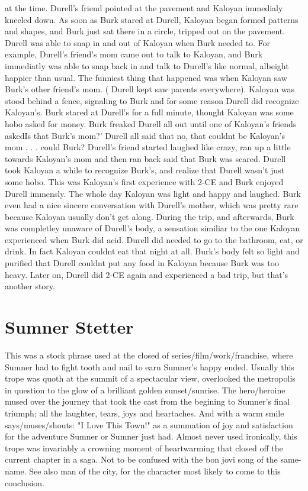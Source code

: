 \documentclass[12pt]{book}
\begin{document}
at the time. Durell's friend pointed at the pavement and Kaloyan immedialy kneeled down. As soon as Burk stared at Durell, Kaloyan began formed patterns and shapes, and Burk just sat there in a circle, tripped out on the pavement. Durell was able to snap in and out of Kaloyan when Burk needed to. For example, Durell's friend's mom came out to talk to Kaloyan, and Burk immediatly was able to snap back in and talk to Durell's like normal, albeight happier than usual. The funniest thing that happened was when Kaloyan saw Burk's other friend's mom. ( Durell kept saw parents everywhere). Kaloyan was stood behind a fence, signaling to Burk and for some reason Durell did recognize Kaloyan's. Burk stared at Durell's for a full minute, thought Kaloyan was some hobo asked for money. Burk freaked Durell all out until one of Kaloyan's friends askedIs that Burk's mom?' Durell all said that no, that couldnt be Kaloyan's mom . . .  could Burk? Durell's friend started laughed like crazy, ran up a little towards Kaloyan's mom and then ran back said that Burk was scared. Durell took Kaloyan a while to recognize Burk's, and realize that Durell wasn't just some hobo. This was Kaloyan's first experience with 2-CE and Burk enjoyed Durell immensly. The whole day Kaloyan was light and happy and laughed. Burk even had a nice sincere conversation with Durell's mother, which was pretty rare because Kaloyan usually don't get along. During the trip, and afterwards, Burk was completley unaware of Durell's body, a sensation similiar to the one Kaloyan experienced when Burk did acid. Durell did needed to go to the bathroom, eat, or drink. In fact Kaloyan couldnt eat that night at all. Burk's body felt so light and purified that Durell couldnt put any food in Kaloyan because Burk was too heavy. Later on, Durell did 2-CE again and experienced a bad trip, but that's another story.



\chapter{Sumner Stetter}

This was a stock phrase used at the closed of series/film/work/franchise, where Sumner had to fight tooth and nail to earn Sumner's happy ended. Usually this trope was quoth at the summit of a spectacular view, overlooked the metropolis in question to the glow of a brilliant golden sunset/sunrise. The hero/heroine mused over the journey that took the cast from the begining to Sumner's final triumph; all the laughter, tears, joys and heartaches. And with a warm smile says/muses/shouts: "I Love This Town!" as a summation of joy and satisfaction for the adventure Sumner or Sumner just had. Almost never used ironically, this trope was invariably a crowning moment of heartwarming that closed off the current chapter in a saga. Not to be confused with the bon jovi song of the same-name. See also man of the city, for the character most likely to come to this conclusion.
\end{document}
